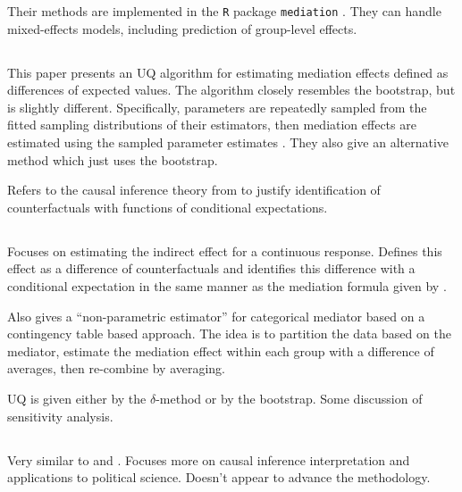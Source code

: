 \documentclass{article}
\begin{document}
Their methods are implemented in the \texttt{R} package \texttt{mediation} \citep{Tin14}. They can handle mixed-effects models, including prediction of group-level effects.


\subsection{\citet{Ima10I}}

This paper presents an UQ algorithm for estimating mediation effects defined as differences of expected values. The algorithm closely resembles the bootstrap, but is slightly different. Specifically, parameters are repeatedly sampled from the fitted sampling distributions of their estimators, then mediation effects are estimated using the sampled parameter estimates \citep[see, e.g.,][]{Kin00}. They also give an alternative method which just uses the bootstrap.

Refers to the causal inference theory from \citet{Ima10II} to justify identification of counterfactuals with functions of conditional expectations.

\subsection{\citet{Ima10II}}

Focuses on estimating the indirect effect for a continuous response. Defines this effect as a difference of counterfactuals and identifies this difference with a conditional expectation in the same manner as the mediation formula given by \citet{Pea12}. 

Also gives a ``non-parametric estimator'' for categorical mediator based on a contingency table based approach. The idea is to partition the data based on the mediator, estimate the mediation effect within each group with a difference of averages, then re-combine by averaging.

UQ is given either by the $\delta$-method or by the bootstrap. Some discussion of sensitivity analysis.


\subsection{\citet{Ima11}}

Very similar to \citet{Ima10I} and \citet{Ima10II}. Focuses more on causal inference interpretation and applications to political science. Doesn't appear to advance the methodology.

\subsection{\citet{Tin14}}
\end{document}
